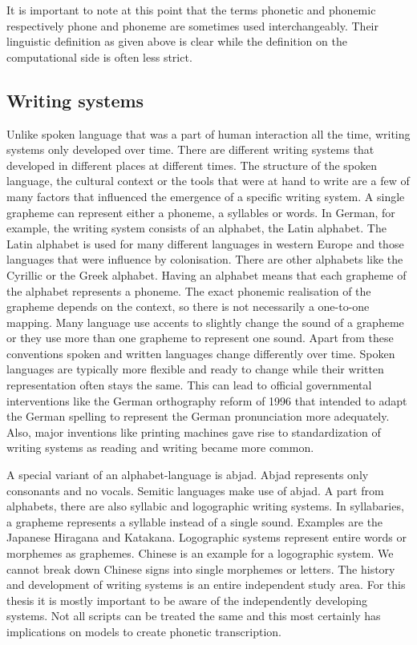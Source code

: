 It is important to note at this point that the terms phonetic and phonemic respectively phone and phoneme are sometimes used interchangeably. Their linguistic definition as given above is clear while the definition on the computational side is often less strict. 


\subsection*{Writing systems}
\label{writing-sys}
Unlike spoken language that was a part of human interaction all the time, writing systems only developed over time. There are different writing systems that developed in different places at different times. The structure of the spoken language, the cultural context or the tools that were at hand to write are a few of many factors that influenced the emergence of a specific writing system. A single grapheme can represent either a phoneme, a syllables or words. In German, for example, the writing system consists of an alphabet, the Latin alphabet.  The Latin alphabet is used for many different languages in western Europe and those languages that were influence by colonisation. There are other alphabets like the Cyrillic or the Greek alphabet. Having an alphabet means that each grapheme of the alphabet represents a phoneme. The exact phonemic realisation of the grapheme depends on the context, so there is not necessarily a one-to-one mapping. Many language use accents to slightly change the sound of a grapheme or they use more than one grapheme to represent one sound. Apart from these conventions spoken and written languages change differently over time. Spoken languages are typically more flexible and ready to change while their written representation often stays the same. This can lead to official governmental interventions like the German orthography reform of 1996 that intended to adapt the German spelling to represent the German pronunciation more adequately. Also, major inventions like printing machines gave rise to standardization of writing systems as reading and writing became more common.

A special variant of an alphabet-language is abjad. Abjad represents only consonants and no vocals. Semitic languages make use of abjad. A part from alphabets, there are also syllabic and logographic writing systems. In syllabaries, a grapheme represents a syllable instead of a single sound. Examples are the Japanese Hiragana and Katakana. Logographic systems represent entire words or morphemes as graphemes. Chinese is an example for a logographic system. We cannot break down Chinese signs into single morphemes or letters. The history and development of writing systems is an entire independent study area. For this thesis it is mostly important to be aware of the independently developing systems. Not all scripts can be treated the same and this most certainly has implications on models to create phonetic transcription. 


